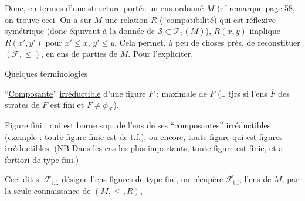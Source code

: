 Donc, en termes d'une structure portée  un ens ordonné $M$ (cf remarque page 58, on trouve ceci. On a sur  $M$ une relation $R$ (``compatibilité) qui est réflexive symétrique (donc équivaut à la donnée de $\mathcal S\subset\mathcal P_2(M)$),  $R(x,y)$ implique $R(x',y')$ pour $x'\leq x$, $y'\leq y$.  Cela permet, à peu de choses près, de reconstituer $(\mathcal F,\leq)$, en ens de parties de $M$. Pour l'expliciter,

Quelques terminologies

``\uline{Composante}'' \uline{irréductible}  d'une figure $F$ :  maximale de $F$ ($\exists$ tjrs si l'ens $\overline F$ des strates de $F$ est fini  et $F\ne\phi_{\mathcal F}$).

Figure  fini : qui est borne sup. de l'ens de ses ``composantes'' irréductibles (exemple : toute figure finie est de t.f.), ou encore, toute figure  qui est  figures irréductibles.  (NB Dans les cas les plus importants, toute figure est finie, et a fortiori de type fini.)

Ceci dit si $\mathcal F_{\mathrm{t.f.}}$ désigne l'ens figures de type fini, on récupère $\overline{\mathcal F_{\mathrm{t.f}}}$, l'ens    de $M$, par la seule connaissance de $(M,\leq,R)$,
